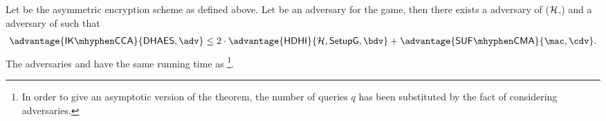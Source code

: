\begin{theorem}\label{th:ik-cca}
    Let \dhaes{} be the asymmetric encryption scheme as defined above. Let \adv{} be an adversary for the \ikcca{} game, then there exists a \hdhi{} adversary \bdv{} of ($\mathcal{H}$,\groupSetup) and a \sufcma{} adversary \cdv{} of \mac{} such that
    \begin{align*}
        \advantage{\ikcca}{\dhaes, \adv} \leq 2\cdot\advantage{\hdhi}{\hashSet, \groupSetup, \bdv} + \advantage{\sufcma}{\mac, \cdv}.
    \end{align*}
    The adversaries \bdv{} and \cdv{} have the same running time as \adv{}\footnote{In order to give an asymptotic version of the theorem, the number of queries $q$ has been substituted by the fact of considering \ppt{} adversaries.}.
\end{theorem}

